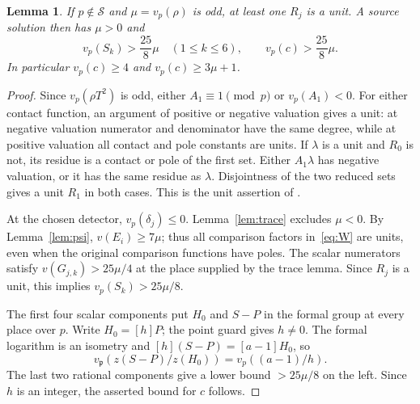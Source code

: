 \documentclass[11pt,a4paper]{article}
\newtheorem{lemma}[theorem]{Lemma}
\begin{document}
\begin{lemma}\label{lem:scalar-odd}
If $p\notin\mathcal S$ and $\mu=v_p(\rho)$ is odd, at least
one $R_j$ is a unit. A source solution then has $\mu>0$ and
\[
 v_p(S_k)>\frac{25}{8}\mu\quad(1\le k\le6),\qquad
 v_p(c)>\frac{25}{8}\mu.
\]
In particular $v_p(c)\ge4$ and $v_p(c)\ge3\mu+1$.
\end{lemma}
\begin{proof}
Since $v_p(\rho T^2)$ is odd, either $A_1\equiv1\pmod p$ or
$v_p(A_1)<0$. For either contact function, an argument of positive
or negative valuation gives a unit: at negative valuation numerator
and denominator have the same degree, while at positive valuation
all contact and pole constants are units. If $\lambda$ is a unit
and $R_0$ is not, its residue is a contact or pole of the first
set. Either $A_1\lambda$ has negative valuation, or it has the
same residue as $\lambda$. Disjointness of the two reduced sets
gives a unit $R_1$ in both cases. This is the unit assertion of
\cite{LocalTests}.

At the chosen detector, $v_p(\delta_j)\le0$. Lemma~\ref{lem:trace}
excludes $\mu<0$. By Lemma~\ref{lem:psi},
$v(E_i)\ge7\mu$; thus all comparison factors in~\eqref{eq:W}
are units, even when the original comparison functions have poles.
The scalar numerators satisfy $v(G_{j,k})>25\mu/4$ at the
place supplied by the trace lemma. Since $R_j$ is a unit, this
implies $v_p(S_k)>25\mu/8$.

The first four scalar components put $H_0$ and $S-P$ in the formal
group at every place over $p$. Write $H_0=[h]P$; the point guard
gives $h\ne0$. The formal logarithm is an isometry and
$[h](S-P)=[a-1]H_0$, so
\[
 v_{\mathfrak p}(z(S-P)/z(H_0))=v_p((a-1)/h).
\]
The last two rational components give a lower bound $>25\mu/8$
on the left. Since $h$ is an integer, the asserted bound for $c$
follows.
\end{proof}
\end{document}
